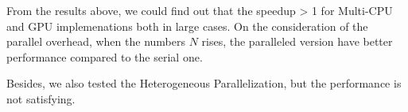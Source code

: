 \vspace{1ex}

From the results above, we could find out that the speedup > 1 for Multi-CPU and GPU implemenations both in large cases.
On the consideration of the parallel overhead, when the numbers $N$ rises, the paralleled version have better performance compared to the serial one.


\vspace{10ex}

Besides, we also tested the Heterogeneous Parallelization, but the performance is not satisfying.

